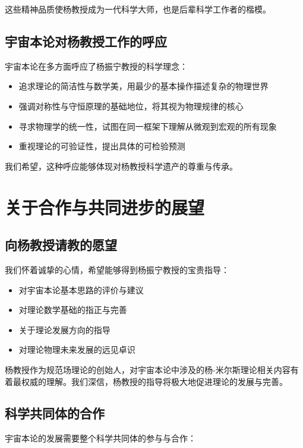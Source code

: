 这些精神品质使杨教授成为一代科学大师，也是后辈科学工作者的楷模。

\subsection{宇宙本论对杨教授工作的呼应}

宇宙本论在多方面呼应了杨振宁教授的科学理念：

\begin{itemize}
  \item 追求理论的简洁性与数学美，用最少的基本操作描述复杂的物理世界
  \item 强调对称性与守恒原理的基础地位，将其视为物理规律的核心
  \item 寻求物理学的统一性，试图在同一框架下理解从微观到宏观的所有现象
  \item 重视理论的可验证性，提出具体的可检验预测
\end{itemize}

我们希望，这种呼应能够体现对杨教授科学遗产的尊重与传承。

\section{关于合作与共同进步的展望}

\subsection{向杨教授请教的愿望}

我们怀着诚挚的心情，希望能够得到杨振宁教授的宝贵指导：

\begin{itemize}
  \item 对宇宙本论基本思路的评价与建议
  \item 对理论数学基础的指正与完善
  \item 关于理论发展方向的指导
  \item 对理论物理未来发展的远见卓识
\end{itemize}

杨教授作为规范场理论的创始人，对宇宙本论中涉及的杨-米尔斯理论相关内容有着最权威的理解。我们深信，杨教授的指导将极大地促进理论的发展与完善。

\subsection{科学共同体的合作}

宇宙本论的发展需要整个科学共同体的参与与合作：

